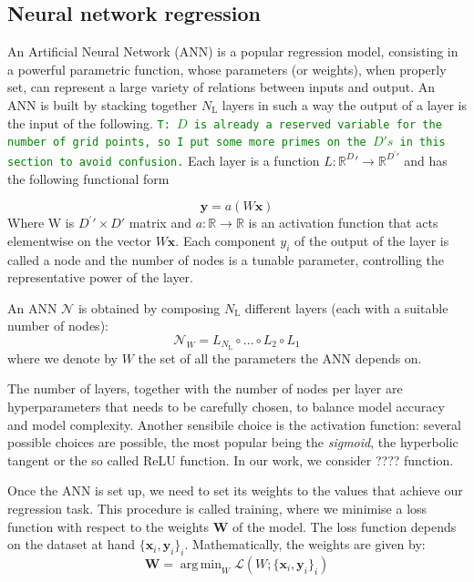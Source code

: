 \documentclass[twocolumn,showpacs,preprintnumbers,nofootinbib,prd,
superscriptaddress,10pt]{revtex4-1}
\newcommand{\R}{\mathbb{R}}
\DeclareMathOperator*{\argmin}{arg\,min}
\newcommand{\tim}[1]{{\textcolor{green}{\texttt{T: #1}} }}
\begin{document}
\subsection{Neural network regression}
\label{sec:NN}

An Artificial Neural Network (ANN) is a popular regression model, consisting in a powerful parametric function, whose parameters (or weights), when properly set, can represent a large variety of relations between inputs and output.
An ANN is built by stacking together $N_\text{L}$ layers in such a way the output of a layer is the input of the following. \tim{$D$ is already a reserved variable for the number of grid points, so I put some more primes on the $D's$ in this section to avoid confusion.} Each layer is a function $L: \R^D\prime \rightarrow \R^{D^\prime\prime} $ and has the following functional form

\begin{equation}
	\boldsymbol{y} = a(W\boldsymbol{x})
\end{equation}
%
Where W is $D^\prime\prime \times D\prime$ matrix and $a: \R \rightarrow \R$ is an activation function that acts elementwise on the vector $W\boldsymbol{x}$.
Each component $y_i$ of the output of the layer is called a node and the number of nodes is a tunable parameter, controlling the representative power of the layer.

An ANN $\mathcal{N}$ is obtained by composing $N_\text{L}$ different layers (each with a suitable number of nodes):
%
\begin{equation}
	\mathcal{N}_W = L_{N_\text{L}} \circ \hdots \circ L_2 \circ L_1
\end{equation}
%
where we denote by $W$ the set of all the parameters the ANN depends on.

The number of layers, together with the number of nodes per layer are hyperparameters that needs to be carefully chosen, to balance model accuracy and model complexity.
Another sensibile choice is the activation function: several possible choices are possible, the most popular being the {\it sigmoid}, the hyperbolic tangent or the so called ReLU function. In our work, we consider ???? function.

Once the ANN is set up, we need to set its weights to the values that achieve our regression task.
This procedure is called training, where we minimise a loss function with respect to the weights $\boldsymbol{W}$ of the model.
The loss function depends on the dataset at hand ${\{\boldsymbol{x}_i, \boldsymbol{y}_i\}_i}$.
Mathematically, the weights are given by:
%
\begin{equation}\label{eq:loss_general}
	\boldsymbol{W} = \argmin_W \mathcal{L}(W; \{\boldsymbol{x}_i, \boldsymbol{y}_i\}_i)
\end{equation}
\end{document}
